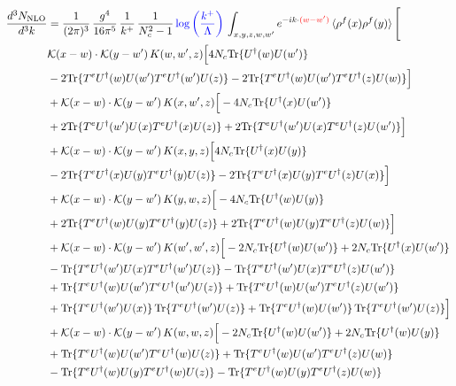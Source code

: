 \documentclass[9pt]{article}
\numberwithin{equation}{section}
\newcommand{\ph}[1]{{\color{red}#1}}
\begin{document}
\begin{align}
    \frac{d^{3}N_{\mathrm{NLO}}}{d^{3}k} & = \frac{1}{(2\pi)^{3}}\,\frac{g^{4}}{16\pi^{5}}\,\frac{1}{k^{+}}\,\frac{1}{N^{2}_{c}-1}\,{\color{blue}\log{\left(\frac{k^{+}}{\Lambda}\right)}}\,\int_{x,y,z,w,w'}e^{-ik\cdot\ph{(w-w')}}\,\langle\rho^{f}(x)\rho^{f}(y) \rangle\,\Bigg[\notag \\ & \mathcal K(x-w)\cdot\mathcal K(y-w')\,K(w,w',z)\Big[4 N_{c}{\rm Tr}\{U^\dagger(w)U(w')\}\notag\\
&-2{\rm Tr}\{T^eU^\dagger(w)U(w')T^eU^\dagger(w')U(z)\}-2{\rm Tr}\{T^eU^\dagger(w)U(w')T^eU^\dagger(z)U(w)\}\Big]\notag\\
&+\mathcal K(x-w)\cdot\mathcal K(y-w')\,K(x,w',z)\Big[-4 N_{c}{\rm Tr}\{U^\dagger(x)U(w')\}\notag\\
&+2{\rm Tr}\{T^eU^\dagger(w')U(x)T^eU^\dagger(x)U(z)\}+2{\rm Tr}\{T^eU^\dagger(w')U(x)T^eU^\dagger(z)U(w')\}\Big]\notag\\
&+\mathcal K(x-w)\cdot\mathcal K(y-w')\,K(x,y,z)\Big[4 N_{c}{\rm Tr}\{U^\dagger(x)U(y)\}\notag\\
&-2{\rm Tr}\{T^eU^\dagger(x)U(y)T^eU^\dagger(y)U(z)\}-2{\rm Tr}\{T^eU^\dagger(x)U(y)T^eU^\dagger(z)U(x)\}\Big]\notag\\
&+\mathcal K(x-w)\cdot\mathcal K(y-w')\,K(y,w,z)\Big[-4 N_{c}{\rm Tr}\{U^\dagger(w)U(y)\}\notag\\
&+2{\rm Tr}\{T^eU^\dagger(w)U(y)T^eU^\dagger(y)U(z)\}+2{\rm Tr}\{T^eU^\dagger(w)U(y)T^eU^\dagger(z)U(w)\}\Big]\notag\\
&+\mathcal K(x-w)\cdot\mathcal K(y-w')\,K(w',w',z)\Big[-2 N_{c}{\rm Tr}\{U^\dagger(w)U(w')\}+2 N_{c}{\rm Tr}\{U^\dagger(x)U(w')\}\notag\\
&-{\rm Tr}\{T^eU^\dagger(w')U(x)T^eU^\dagger(w')U(z)\}-{\rm Tr}\{T^eU^\dagger(w')U(x)T^eU^\dagger(z)U(w')\}\notag\\
&+{\rm Tr}\{T^eU^\dagger(w)U(w')T^eU^\dagger(w')U(z)\}+{\rm Tr}\{T^eU^\dagger(w)U(w')T^eU^\dagger(z)U(w')\}\notag\\
&+{\rm Tr}\{T^eU^\dagger(w')U(x)\}\,{\rm Tr}\{T^eU^\dagger(w')U(z)\}+{\rm Tr}\{T^eU^\dagger(w)U(w')\}\,{\rm Tr}\{T^eU^\dagger(w')U(z)\}\Big]\notag\\
&+\mathcal K(x-w)\cdot\mathcal K(y-w')\,K(w,w,z)\Big[-2 N_{c}{\rm Tr}\{U^\dagger(w)U(w')\}+2 N_{c}{\rm Tr}\{U^\dagger(w)U(y)\}\notag\\
&+{\rm Tr}\{T^eU^\dagger(w)U(w')T^eU^\dagger(w)U(z)\}+{\rm Tr}\{T^eU^\dagger(w)U(w')T^eU^\dagger(z)U(w)\}\notag\\
&-{\rm Tr}\{T^eU^\dagger(w)U(y)T^eU^\dagger(w)U(z)\}-{\rm Tr}\{T^eU^\dagger(w)U(y)T^eU^\dagger(z)U(w)\}\notag\\

\end{align}
\end{document}
